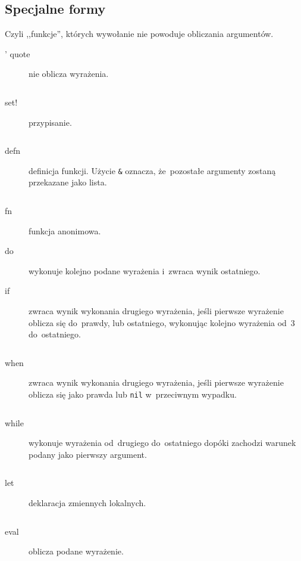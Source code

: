 \documentclass[a4paper,11pt]{article}
\newcommand{\clj}[1]{
\inputminted[fontsize=\footnotesize,frame=single,samepage=true]{clojure}{code/#1.clj}
}
\begin{document}
\subsection{Specjalne formy}

Czyli ,,funkcje'', których wywołanie nie powoduje obliczania argumentów.

\begin{description}
\item[' quote] nie oblicza wyrażenia.
  \clj{quote}

%
%

\item[set!] przypisanie.
  \clj{set!}

\item[defn] definicja funkcji. Użycie \verb+&+ oznacza, że~pozostałe argumenty
  zostaną przekazane jako lista.
  \clj{defn}

\item[fn] funkcja anonimowa.

\item[do] wykonuje kolejno podane wyrażenia i~zwraca wynik ostatniego.

\item[if] zwraca wynik wykonania drugiego wyrażenia, jeśli pierwsze wyrażenie
  oblicza się do~prawdy, lub ostatniego, wykonując kolejno wyrażenia od~3
  do~ostatniego.
  \clj{if}

\item[when] zwraca wynik wykonania drugiego wyrażenia, jeśli pierwsze wyrażenie
  oblicza się jako prawda lub \verb+nil+ w~przeciwnym wypadku.
  \clj{when}

\item[while] wykonuje wyrażenia od~drugiego do~ostatniego dopóki zachodzi
  warunek podany jako pierwszy argument.
  \clj{while}

\item[let] deklaracja zmiennych lokalnych.
  \clj{let}

\item[eval] oblicza podane wyrażenie.
  \clj{eval}
\end{description}
\end{document}
